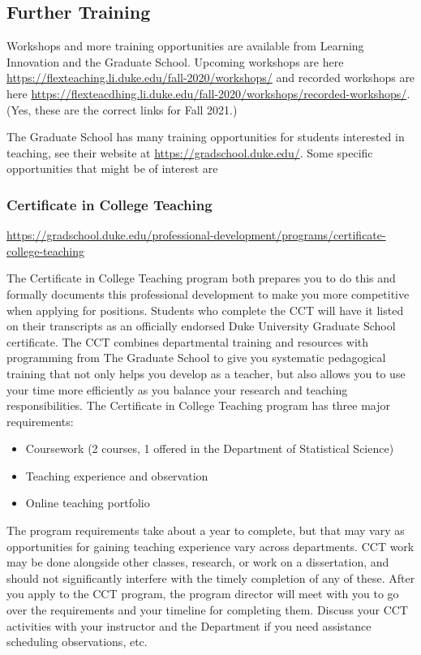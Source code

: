 \documentclass[
]{article}
\begin{document}
\hypertarget{further-training}{%
\subsection{Further Training}\label{further-training}}

Workshops and more training opportunities are available from Learning Innovation and the Graduate School. Upcoming workshops are here \url{https://flexteaching.li.duke.edu/fall-2020/workshops/} and recorded workshops are here \url{https://flexteacdhing.li.duke.edu/fall-2020/workshops/recorded-workshops/}. (Yes, these are the correct links for Fall 2021.)

The Graduate School has many training opportunities for students interested in teaching, see their website at \url{https://gradschool.duke.edu/}. Some specific opportunities that might be of interest are

\hypertarget{certificate-in-college-teaching}{%
\subsubsection{Certificate in College Teaching}\label{certificate-in-college-teaching}}

\url{https://gradschool.duke.edu/professional-development/programs/certificate-college-teaching}

The Certificate in College Teaching program both prepares you to do this and formally documents this professional development to make you more competitive when applying for positions. Students who complete the CCT will have it listed on their transcripts as an officially endorsed Duke University Graduate School certificate. The CCT combines departmental training and resources with programming from The Graduate School to give you systematic pedagogical training that not only helps you develop as a teacher, but also allows you to use your time more efficiently as you balance your research and teaching responsibilities. The Certificate in College Teaching program has three major requirements:

\begin{itemize}
\item
  Coursework (2 courses, 1 offered in the Department of Statistical Science)
\item
  Teaching experience and observation
\item
  Online teaching portfolio
\end{itemize}

The program requirements take about a year to complete, but that may vary as opportunities for gaining teaching experience vary across departments. CCT work may be done alongside other classes, research, or work on a dissertation, and should not significantly interfere with the timely completion of any of these. After you apply to the CCT program, the program director will meet with you to go over the requirements and your timeline for completing them. Discuss your CCT activities with your instructor and the Department if you need assistance scheduling observations, etc.
\end{document}

